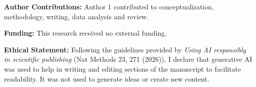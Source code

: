 \documentclass[twoside,twocolumn,10pt]{article}
\begin{document}
\textbf{Author Contributions:} Author 1 contributed to conceptualization, methodology, writing, data analysis and review.

\textbf{Funding:} This research received no external funding.

\textbf{Ethical Statement:} Following the guidelines provided by \textit{Using AI responsibly in scientific publishing} (Nat Methods 23, 271 (2026)), I declare that generative AI was used to help in writing and editing sections of the manuscript to facilitate readability. It was not used to generate ideas or create new content.

\balance
\fontsize{11}{13}\selectfont
\printbibliography
\end{document}
